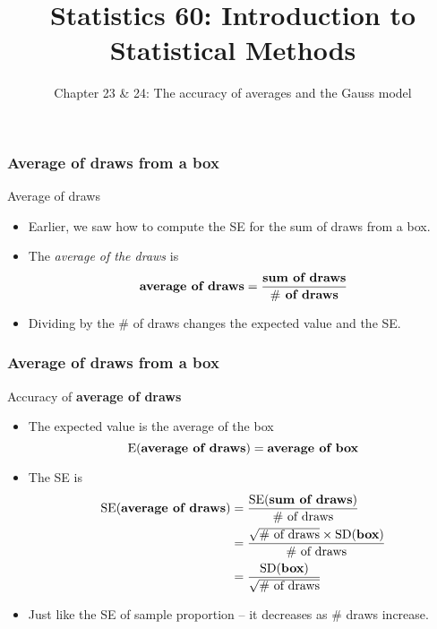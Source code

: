 \documentclass[handout]{beamer}
\title{Statistics 60: Introduction to Statistical Methods}
\subtitle{Chapter 23 \& 24: The accuracy of averages and the Gauss model}
\author{}%
\begin{document}
   \begin{frame}
   \titlepage
   \end{frame}


   \begin{frame} \frametitle{Average of draws from a box}

   \begin{block}
   {Average of draws}
   \begin{itemize}
   \item Earlier, we saw how to compute the SE for the sum of draws from a box.
   \item The {\em average of the draws} is
   $$
   \text{\bf average of draws} = \frac{\text{\bf sum of draws}}{\text{{\bf $\#$ of draws}}}
   $$

   \item Dividing by the $\#$ of draws changes the expected value and the SE.
   \end{itemize}
   \end{block}
   \end{frame}


   \begin{frame} \frametitle{Average of draws from a box}

   \begin{block}
   {Accuracy of {\bf average of draws}}
   \begin{itemize}
   \item The expected value is the average of the box
   $$
   \text{E({\bf average of draws})} = \text{\bf average of box}
   $$

   \item The SE is
   $$
   \begin{aligned}
      \text{SE({\bf average of draws})} &= \frac{\text{SE({\bf sum of draws})}}{\text{$\#$ of draws}}      \\
      &= \frac{\sqrt{\text{$\#$ of draws}} \times \text{SD({\bf box})}}{{\text{$\#$ of draws}}}      \\
      &= \frac{\text{SD({\bf box})}}{\sqrt{\text{$\#$ of draws}}}      \\
   \end{aligned}
   $$
   \item Just like the SE of sample proportion -- it decreases as \# draws increase.
   \end{itemize}
   \end{block}
   \end{frame}
\end{document}
